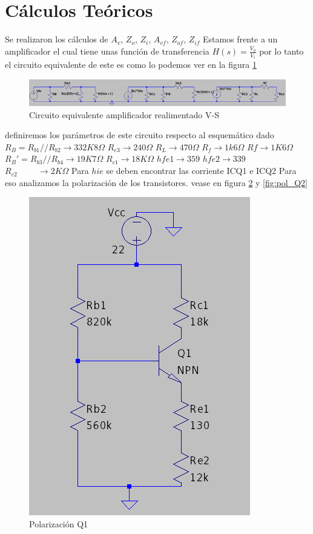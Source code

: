 \documentclass[12pt, letterpaper]{article}
\begin{document}
\section{Cálculos Teóricos}
Se realizaron los cálculos de $A_v$, $Z_o$, $Z_i$, $A_{vf}$, $Z_{of}$, $Z_{if}$
\singlespacing
Estamos frente a un amplificador el cual tiene unas función de transferencia $H(s)=\frac{V_o}{V_i}
$ por lo tanto el circuito equivalente de este es como lo podemos ver en la figura \ref{fig:cir_equivalente_señal}
\begin{figure}[H]
	\centering
	\includegraphics[width=1\textwidth]{Imagenes/circeq.png}
	\caption{Circuito equivalente amplificador realimentado V-S}
	\label{fig:cir_equivalente_señal}
\end{figure}
\singlespacing
definiremos los parámetros de este circuito respecto al esquemático dado
\singlespacing
$R_B=R_{b1}//R_{b2} \rightarrow 332K8\Omega$\hspace{1cm} 
\singlespacing
$R_{e3} \rightarrow 240\Omega$\hspace{1cm} $R_{L} \rightarrow 470\Omega$ \hspace{1cm} $R_{f} \rightarrow 1k6\Omega$
\singlespacing
$Rf \rightarrow 1K6\Omega$ \hspace{1cm} $R_B'=R_{b3}//R_{b4} \rightarrow 19K7\Omega$ \hspace{1cm} $R_{c1} \rightarrow18K\Omega$
\singlespacing
$hfe1 \rightarrow 359$ \hspace{1cm} $hfe2 \rightarrow 339$ $R_{c2} \hspace{1cm} \rightarrow 2K\Omega$
\singlespacing
Para $hie$ se deben encontrar las corriente ICQ1 e ICQ2 Para eso analizamos la polarización de los transistores. vease en figura \ref{fig:pol_Q1} y \ref{fig:pol_Q2}
\begin{figure}[H]
	\centering
	\includegraphics[height=0.75\textwidth]{Imagenes/polarizacionQ1.png}
	\caption{Polarización Q1}
	\label{fig:pol_Q1}
\end{figure}
\end{document}
